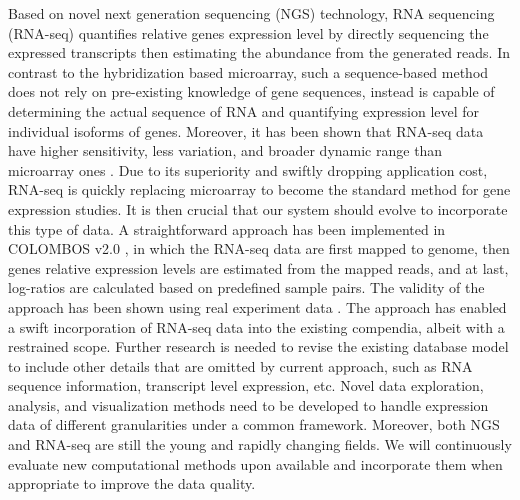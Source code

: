 Based on novel next generation sequencing (NGS) technology, RNA sequencing
(RNA-seq) quantifies relative genes expression level by directly sequencing the
expressed transcripts then estimating the abundance from the generated reads.
%
In contrast to the hybridization based microarray, such a sequence-based method
does not rely on pre-existing knowledge of gene sequences, instead is capable
of determining the actual sequence of RNA and quantifying expression level for
individual isoforms of genes.
%
Moreover, it has been shown that RNA-seq data have higher sensitivity, less
variation, and broader dynamic range than microarray ones
\cite{Sirbu2012,Marioni2008}.
%
Due to its superiority and swiftly dropping application cost, RNA-seq is
quickly replacing microarray to become the standard method for gene expression
studies.
%
It is then crucial that our system should evolve to incorporate this type of
data.
%
A straightforward approach has been implemented in COLOMBOS v2.0
\cite{Meysman2014}, in which the RNA-seq data are first mapped to genome, then
genes relative expression levels are estimated from the mapped reads, and at 
last, log-ratios are calculated based on predefined sample pairs.
%
The validity of the approach has been shown using real experiment data
\cite{Meysman2014}.
%
The approach has enabled a swift incorporation of RNA-seq data into the
existing compendia, albeit with a restrained scope.
%
Further research is needed to revise the existing database model to include
other details that are omitted by current approach, such as RNA sequence
information, transcript level expression, etc.
%
Novel data exploration, analysis, and visualization methods need to be
developed to handle expression data of different granularities under a common
framework.
%
Moreover, both NGS and RNA-seq are still the young and rapidly changing
fields. We will continuously evaluate new computational methods upon available
and incorporate them when appropriate to improve the data quality.




%

